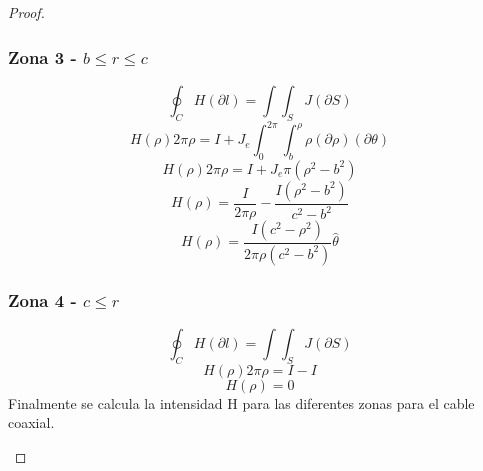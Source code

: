 \begin{proof}
\begin{enumerate}
        \subsubsection*{ Zona 3 - $b\leq r \leq  c $}
        \begin{equation}
            \oint_C H (\partial l) =  \int\int_{S} J (\partial S)
        \end{equation}
        \begin{equation}
            H(\rho) 2\pi \rho = I + J_{e} \int_{0}^{2\pi} \int_{b}^{\rho} \rho (\partial \rho )(\partial \theta )
        \end{equation}
        \begin{equation}
             H(\rho) 2\pi \rho = I + J_{e} \pi (\rho^{2} - b^{2})
        \end{equation}
        \begin{equation}
              H(\rho) = \frac{I}{2\pi \rho} - \frac{I (\rho^{2} - b^{2})}{c^{2} - b^{2}}
        \end{equation}
        \begin{equation}
              H(\rho) = \frac{I(c^{2} - \rho^{2})}{2\pi \rho (c^{2} - b^{2})} \hat{\theta}
        \end{equation}
        
        \subsubsection*{ Zona 4 - $c\leq  r $}
        \begin{equation}
            \oint_C H (\partial l) =  \int\int_{S} J (\partial S)
        \end{equation}
        \begin{equation}
             H(\rho) 2\pi \rho = I-I
        \end{equation}
        \begin{equation}
            H(\rho) = 0
        \end{equation}
        Finalmente se calcula la intensidad H para las diferentes zonas para el cable coaxial.
        

\end{enumerate}
\end{proof}
